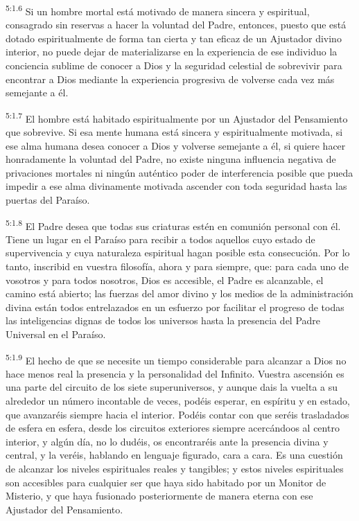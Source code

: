 \par
\textsuperscript{5:1.6} Si un hombre mortal está motivado de manera sincera y espiritual, consagrado sin reservas a hacer la voluntad del Padre, entonces, puesto que está dotado espiritualmente de forma tan cierta y tan eficaz de un Ajustador divino interior, no puede dejar de materializarse en la experiencia de ese individuo la conciencia sublime de conocer a Dios y la seguridad celestial de sobrevivir para encontrar a Dios mediante la experiencia progresiva de volverse cada vez más semejante a él.

\par
\textsuperscript{5:1.7} El hombre está habitado espiritualmente por un Ajustador del Pensamiento que sobrevive. Si esa mente humana está sincera y espiritualmente motivada, si ese alma humana desea conocer a Dios y volverse semejante a él, si quiere hacer honradamente la voluntad del Padre, no existe ninguna influencia negativa de privaciones mortales ni ningún auténtico poder de interferencia posible que pueda impedir a ese alma divinamente motivada ascender con toda seguridad hasta las puertas del Paraíso.

\par
\textsuperscript{5:1.8} El Padre desea que todas sus criaturas estén en comunión personal con él. Tiene un lugar en el Paraíso para recibir a todos aquellos cuyo estado de supervivencia y cuya naturaleza espiritual hagan posible esta consecución. Por lo tanto, inscribid en vuestra filosofía, ahora y para siempre, que: para cada uno de vosotros y para todos nosotros, Dios es accesible, el Padre es alcanzable, el camino está abierto; las fuerzas del amor divino y los medios de la administración divina están todos entrelazados en un esfuerzo por facilitar el progreso de todas las inteligencias dignas de todos los universos hasta la presencia del Padre Universal en el Paraíso.

\par
\textsuperscript{5:1.9} El hecho de que se necesite un tiempo considerable para alcanzar a Dios no hace menos real la presencia y la personalidad del Infinito. Vuestra ascensión es una parte del circuito de los siete superuniversos, y aunque dais la vuelta a su alrededor un número incontable de veces, podéis esperar, en espíritu y en estado, que avanzaréis siempre hacia el interior. Podéis contar con que seréis trasladados de esfera en esfera, desde los circuitos exteriores siempre acercándoos al centro interior, y algún día, no lo dudéis, os encontraréis ante la presencia divina y central, y la veréis, hablando en lenguaje figurado, cara a cara. Es una cuestión de alcanzar los niveles espirituales reales y tangibles; y estos niveles espirituales son accesibles para cualquier ser que haya sido habitado por un Monitor de Misterio, y que haya fusionado posteriormente de manera eterna con ese Ajustador del Pensamiento.

